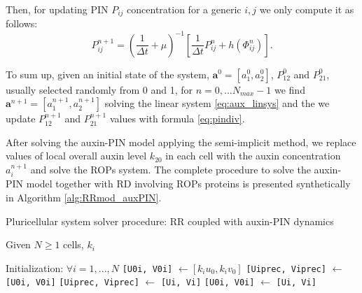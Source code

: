Then, for updating PIN $P_{ij}$ concentration for a generic $i,j$ we only compute it as follows:
\begin{equation}\label{eq:pindiv}
  P_{ij}^{n+1} = \left(\frac{1}{\Delta t} + \mu \right)^{-1} \left[ \frac{1}{\Delta t} P_{ij}^{n} + h\left(\Phi_{ij}^n \right) \right].
\end{equation}

To sum up, given an initial state of the system, $\mathbf{a}^0 = \left[a_1^0, a_2^0 \right]$, $P_{12}^0$ and $P_{21}^0$, usually selected randomly from 0 and 1, for $n = 0, ... N_{max}-1$ we find $\mathbf{a}^{n+1} = \left[a_1^{n+1}, a_2^{n+1}\right]$ solving the linear system \eqref{eq:aux_linsys} and the we update $P_{12}^{n+1}$ and $P_{21}^{n+1}$ values with formula \eqref{eq:pindiv}.

After solving the auxin-PIN model applying the semi-implicit method, we replace values of local overall auxin level $k_{20}$ in each cell with the auxin concentration $a_i^{n+1}$ and solve the ROPs system. The complete procedure to solve the auxin-PIN model together with RD involving ROPs proteins is presented synthetically in Algorithm \ref{alg:RRmod_auxPIN}.
\begin{algorithm}[H]
    \caption{Pluricellular system solver procedure: RR coupled with auxin-PIN dynamics}
    \label{alg:RRmod_auxPIN}
    Given $N \geq 1$ cells, $k_i$
    \begin{algorithmic}[1]
    \STATE Initialization: $\forall i = 1, ..., N$
    \STATE \verb|[U0i, V0i]| $\gets [k_i u_0, k_i v_0]$
    \STATE \verb|[Uiprec, Viprec]| $\gets$  \verb|[U0i, V0i]|
    \STATE \verb|[Uiprec, Viprec]| $\gets$  \verb|[Ui, Vi]|
    \ENDFOR
    \STATE \verb|[U0i, V0i]| $\gets$  \verb|[Ui, Vi]|
    \ENDWHILE
    \end{algorithmic}
\end{algorithm}

